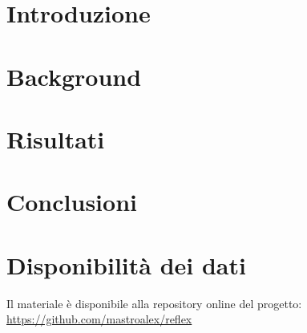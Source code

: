 \section{Introduzione}

\textcolor{blue}{\lipsum[1-2]}

\section{Background}
\textcolor{blue}{}


\section{Risultati}
\textcolor{blue}{\lipsum[1-5]}


\section{Conclusioni}

\textcolor{blue}{\lipsum[1-2]}
\raggedbottom
\pagebreak
\section*{Disponibilità dei dati}

Il materiale è disponibile alla repository online del progetto: \url{https://github.com/mastroalex/reflex}


\raggedbottom
\printbibliography[title=Riferimenti]






